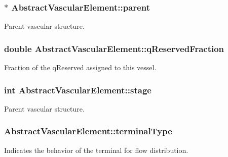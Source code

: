 \subsubsection[{\texorpdfstring{parent}{parent}}]{$\ast$ Abstract\+Vascular\+Element\+::parent}\hypertarget{class_abstract_vascular_element_aa43cbab70a108afebfdacd3e8a181b38}{}\label{class_abstract_vascular_element_aa43cbab70a108afebfdacd3e8a181b38}
Parent vascular structure. 
\subsubsection[{\texorpdfstring{q\+Reserved\+Fraction}{qReservedFraction}}]{\setlength{\rightskip}{0pt plus 5cm}double Abstract\+Vascular\+Element\+::q\+Reserved\+Fraction}\hypertarget{class_abstract_vascular_element_a6137eb31a060a8806a44204b421d074f}{}\label{class_abstract_vascular_element_a6137eb31a060a8806a44204b421d074f}
Fraction of the q\+Reserved assigned to this vessel. 
\subsubsection[{\texorpdfstring{stage}{stage}}]{\setlength{\rightskip}{0pt plus 5cm}int Abstract\+Vascular\+Element\+::stage}\hypertarget{class_abstract_vascular_element_a8a9351cffd2ca12dd531ab10fcd01b81}{}\label{class_abstract_vascular_element_a8a9351cffd2ca12dd531ab10fcd01b81}
Parent vascular structure. 
\subsubsection[{\texorpdfstring{terminal\+Type}{terminalType}}]{ Abstract\+Vascular\+Element\+::terminal\+Type}\hypertarget{class_abstract_vascular_element_a334fcc3576ed763aee815e8930251b94}{}\label{class_abstract_vascular_element_a334fcc3576ed763aee815e8930251b94}
Indicates the behavior of the terminal for flow distribution. 
